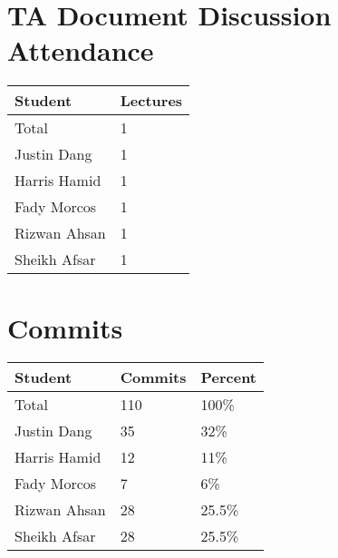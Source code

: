 \documentclass{article}
\begin{document}

\section{TA Document Discussion Attendance}


\begin{table}[H]
\centering
\begin{tabular}{ll}
\toprule
\textbf{Student} & \textbf{Lectures}\\
\midrule
Total & 1\\
Justin Dang & 1\\
Harris Hamid & 1\\
Fady Morcos & 1\\
Rizwan Ahsan & 1\\
Sheikh Afsar & 1\\
\bottomrule
\end{tabular}
\end{table}


\section{Commits}


\begin{table}[H]
\centering
\begin{tabular}{lll}
\toprule
\textbf{Student} & \textbf{Commits} & \textbf{Percent}\\
\midrule
Total & 110 & 100\% \\
Justin Dang & 35 & 32\% \\
Harris Hamid & 12 & 11\% \\
Fady Morcos & 7 & 6\% \\
Rizwan Ahsan & 28 & 25.5\% \\
Sheikh Afsar & 28 & 25.5\% \\
\bottomrule
\end{tabular}
\end{table}
\end{document}
